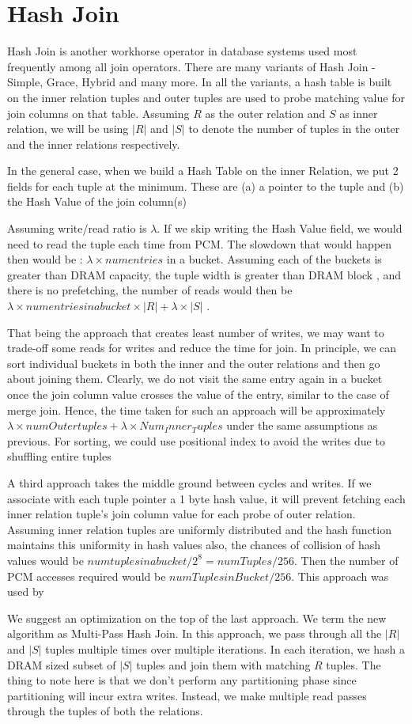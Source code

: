 \chapter{Hash Join}
\label{hj}

Hash Join is another workhorse operator in database systems used most frequently among all join operators. There are many variants of Hash Join - Simple, Grace, Hybrid and many more. In all the variants, a hash table is built on the inner relation tuples and outer tuples are used to probe matching value for join columns on that table. Assuming $R$ as the outer relation and $S$ as inner relation, we will be using $|R|$ and $|S|$ to denote the number of tuples in the outer and the inner relations respectively.

In the general case, when we build a Hash Table on the inner Relation, we put 2 fields for each tuple at the minimum. These are (a) a pointer to the tuple and (b) the Hash Value of the join column(s)

Assuming write/read ratio is $\lambda$. If we skip writing the Hash Value field, we would need to read the tuple each time from PCM. The slowdown that would happen then would be : $\lambda \times numentries$ in a bucket. Assuming each of the buckets is greater than DRAM capacity, the tuple width is greater than DRAM block , and there is no prefetching, the number of reads would then be $\lambda \times numentries in a bucket \times |R| + \lambda \times |S|$ . 

That being the approach that creates least number of writes, we may want to trade-off some reads for writes and reduce the time for join. In principle, we can sort individual buckets in both the inner and the outer relations and then go about joining them. Clearly, we do not visit the same entry again in a bucket once the join column value crosses the value of the entry, similar to the case of merge join. Hence, the time taken for such an approach will be approximately $\lambda \times numOuter tuples + \lambda \times Num_Inner_Tuples$ under the same assumptions as previous. For sorting, we could use positional index to avoid the writes due to shuffling entire tuples

A third approach takes the middle ground between cycles and writes. If we associate with each tuple pointer a 1 byte hash value, it will prevent fetching each inner relation tuple's join column value for each probe of outer relation. Assuming inner relation tuples are uniformly distributed and the hash function maintains this uniformity in hash values also, the chances of collision of hash values would be  $numtuples in a bucket/2^8 = numTuples/256 $. Then the number of PCM accesses required would be $numTuplesinBucket/256$. This approach was used by \cite{abhimanyu}

We suggest an optimization on the top of the last approach. We term the new algorithm as Multi-Pass Hash Join. In this approach, we pass through all the $|R|$ and $|S|$ tuples multiple times over multiple iterations. In each iteration, we hash a DRAM sized subset of $|S|$ tuples and join them with matching $R$ tuples. The thing to note here is that we don't perform any partitioning phase since partitioning will incur extra writes. Instead, we make multiple read passes through the tuples of both the relations.